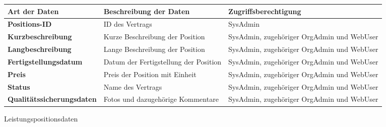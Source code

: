 \begin{figure}[h]
	\centering
	\begin{tabularx}{\textwidth}{| X || X | X |}
        \hline
		\textbf{Art der Daten} & \textbf{Beschreibung der Daten} & \textbf{Zugriffsberechtigung} \\ \hline \hline
		\textbf{Positions-ID} & ID des Vertrags & SysAdmin \\ \hline
        \textbf{Kurzbeschreibung} & Kurze Beschreibung der Position & SysAdmin, zugehöriger OrgAdmin und WebUser \\ \hline
        \textbf{Langbeschreibung} & Lange Beschreibung der Position & SysAdmin, zugehöriger OrgAdmin und WebUser \\ \hline
        \textbf{Fertigstellungsdatum} & Datum der Fertigstellung der Position & SysAdmin, zugehöriger OrgAdmin und WebUser \\ \hline
        \textbf{Preis} & Preis der Position mit Einheit & SysAdmin, zugehöriger OrgAdmin und WebUser \\ \hline
		\textbf{Status} & Name des Vertrags & SysAdmin, zugehöriger OrgAdmin und WebUser \\ \hline
		\textbf{Qualitätssicherungsdaten} & Fotos und dazugehörige Kommentare & SysAdmin, zugehöriger OrgAdmin und WebUser \\ \hline
	\end{tabularx}
	\caption{Leistungspositionsdaten}
	\label{fig:Leistungspositionsdaten}
\end{figure}
